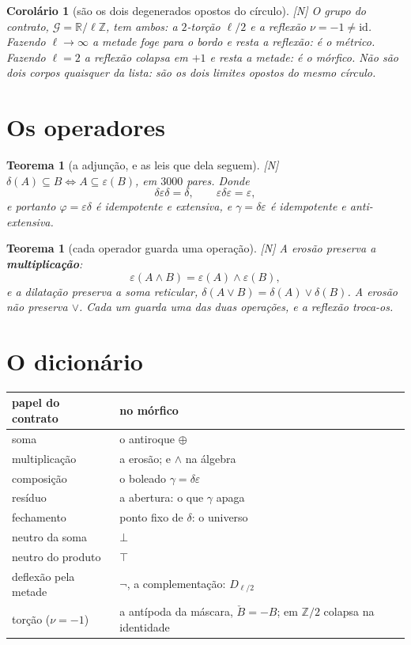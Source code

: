 \documentclass[12pt,a4paper]{article}
\newcommand{\RR}{\mathbb{R}}
\newcommand{\ZZ}{\mathbb{Z}}
\newcommand{\GG}{\mathcal{G}}
\newcommand{\est}[1]{\textsf{\footnotesize[#1]}}
\newtheorem{teorema}[definicao]{Teorema}
\newtheorem{corolario}[definicao]{Corolário}
\begin{document}
\begin{corolario}[são os dois degenerados opostos do círculo]\label{cor:degenerados}
\est{N} O grupo do contrato, $\GG=\RR/\ell\ZZ$, tem \emph{ambos}: a $2$-torção $\ell/2$ e a reflexão $\nu=-1\neq
\mathrm{id}$. Fazendo $\ell\to\infty$ a metade foge para o bordo e resta a reflexão: é o métrico. Fazendo
$\ell=2$ a reflexão colapsa em $+1$ e resta a metade: é o mórfico. \emph{Não são dois corpos quaisquer da lista:
são os dois limites opostos do mesmo círculo.}
\end{corolario}

\section{Os operadores}

\begin{teorema}[a adjunção, e as leis que dela seguem]\label{teo:adjuncao}
\est{N} $\delta(A)\subseteq B \iff A\subseteq\varepsilon(B)$, em $3000$ pares. Donde
\[
\delta\varepsilon\delta=\delta,
\qquad
\varepsilon\delta\varepsilon=\varepsilon,
\]
e portanto $\varphi=\varepsilon\delta$ é idempotente e extensiva, e $\gamma=\delta\varepsilon$ é idempotente e
anti-extensiva.
\end{teorema}

\begin{teorema}[cada operador guarda uma operação]\label{teo:guarda}
\est{N} A erosão preserva a \textbf{multiplicação}:
\[
\varepsilon(A\wedge B)=\varepsilon(A)\wedge\varepsilon(B),
\]
e a dilatação preserva a soma reticular, $\delta(A\vee B)=\delta(A)\vee\delta(B)$. A erosão \emph{não} preserva
$\vee$. Cada um guarda uma das duas operações, e a reflexão troca-os.
\end{teorema}

\section{O dicionário}

\begin{center}
\renewcommand{\arraystretch}{1.3}
\begin{tabular}{ll}
\hline
\textbf{papel do contrato} & \textbf{no mórfico}\\
\hline
soma              & o antiroque $\oplus$\\
multiplicação     & a erosão; e $\wedge$ na álgebra\\
composição        & o boleado $\gamma=\delta\varepsilon$\\
resíduo           & a abertura: o que $\gamma$ apaga\\
fechamento        & ponto fixo de $\delta$: o universo\\
neutro da soma    & $\bot$\\
neutro do produto & $\top$\\
deflexão pela metade & $\neg$, a complementação: $D_{\ell/2}$\\
torção ($\nu=-1$)  & a antípoda da máscara, $\check B=-B$; em $\ZZ/2$ colapsa na identidade\\
\hline
\end{tabular}
\end{center}
\end{document}
